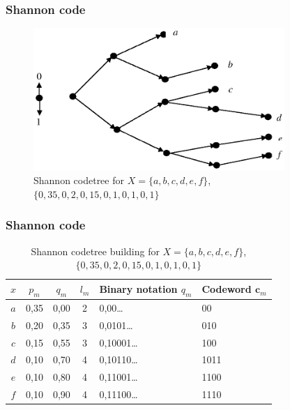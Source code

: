 \documentclass[14pt]{beamer}
\renewcommand{\vec}[1]{\ensuremath{\boldsymbol{#1}}}
\begin{document}
\begin{frame}
\frametitle{Shannon code}
\begin{itemize}    

\begin{figure}[ht]
\includegraphics[width=0.85\textwidth]{fig2_6.eps}
\caption{Shannon codetree for $X =
\{a,b,c,d,e,f\}$, $\{0,35, 0,2, 0,15,
0,1, 0,1, 0,1\}$} \label{Shan_tree}
\end{figure}

\end{itemize}
\end{frame}


\begin{frame}
\frametitle{Shannon code}
\begin{itemize}    

    \begin{table}[htbp]
    \caption{ Shannon codetree building for $X =
    \{a,b,c,d,e,f\}$, $\{0,35, 0,2, 0,15,
    0,1, 0,1, 0,1\}$}\label{tab_sh}
    \scalebox{0.70} {
    \begin{tabular}{|c|c|c|c|l|l|}
    \hline
        $x$ & $p_m$ & $q_m$  &  $l_m $ & Binary notation $q_m$&
   Codeword $\vec c_m $ \\
    \hline $a$& 0,35& 0,00& 2& 0,00\ldots &
    00 \\
    \hline $b$& 0,20& 0,35& 3& 0,0101\ldots &
    010 \\
    \hline
    $c$& 0,15& 0,55& 3& 0,10001\ldots &
    100 \\
    \hline
    $d$& 0,10& 0,70& 4& 0,10110\ldots &
    1011 \\
    \hline
    $e$& 0,10& 0,80& 4& 0,11001\ldots &
    1100 \\
    \hline
    $f$&
    0,10&
    0,90&
    4&
    0,11100\ldots &
    1110 \\
    \hline
    \end{tabular}
    }
    \end{table}

\end{itemize}
\end{frame}
\end{document}
